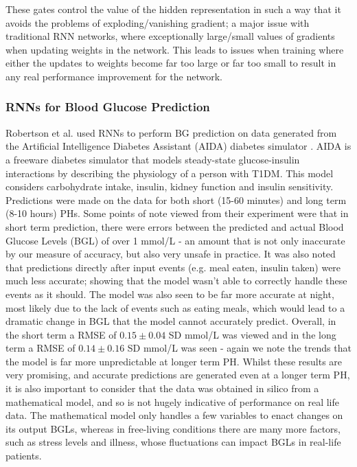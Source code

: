       These gates control the value of the hidden representation in such a way that it avoids the problems of exploding/vanishing gradient; a major issue with traditional RNN networks, where exceptionally large/small values of gradients when updating weights in the network. This leads to issues when training where either the updates to weights become far too large or far too small to result in any real performance improvement for the network.

      \subsubsection{RNNs for Blood Glucose Prediction}
      Robertson et al. \cite{paper1} used RNNs to perform BG prediction on data generated from the Artificial Intelligence Diabetes Assistant (AIDA) diabetes simulator \cite{AIDA}. AIDA is a freeware diabetes simulator that models steady-state glucose-insulin interactions by describing the physiology of a person with T1DM. This model considers carbohydrate intake, insulin, kidney function and insulin sensitivity. Predictions were made on the data for both short (15-60 minutes) and long term (8-10 hours) PHs. Some points of note viewed from their experiment were that in short term prediction, there were errors between the predicted and actual Blood Glucose Levels (BGL) of over 1 mmol/L - an amount that is not only inaccurate by our measure of accuracy, but also very unsafe in practice. It was also noted that predictions directly after input events (e.g. meal eaten, insulin taken) were much less accurate; showing that the model wasn't able to correctly handle these events as it should. The model was also seen to be far more accurate at night, most likely due to the lack of events such as eating meals, which would lead to a dramatic change in BGL that the model cannot accurately predict. Overall, in the short term a RMSE of $0.15 \pm 0.04$ SD mmol/L was viewed and in the long term a RMSE of $0.14 \pm 0.16$ SD mmol/L was seen - again we note the trends that the model is far more unpredictable at longer term PH. Whilst these results are very promising, and accurate predictions are generated even at a longer term PH, it is also important to consider that the data was obtained in silico from a mathematical model, and so is not hugely indicative of performance on real life data. The mathematical model only handles a few variables to enact changes on its output BGLs, whereas in free-living conditions there are many more factors, such as stress levels and illness, whose fluctuations can impact BGLs in real-life patients.
      
